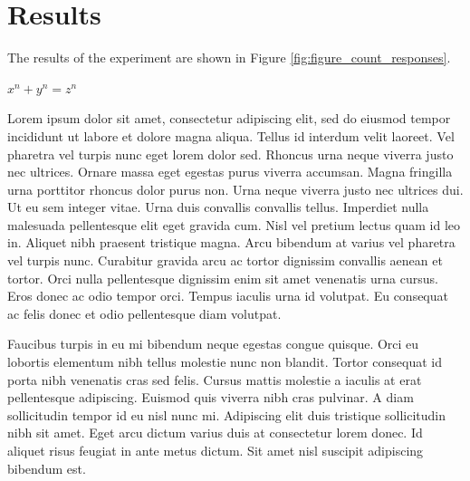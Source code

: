 

\section{Results}

The results of the experiment are shown in Figure \ref{fig:figure_count_responses}.

$ x^n + y^n = z^n $

Lorem ipsum dolor sit amet, consectetur adipiscing elit, sed do eiusmod tempor incididunt ut labore et dolore magna aliqua. Tellus id interdum velit laoreet. Vel pharetra vel turpis nunc eget lorem dolor sed. Rhoncus urna neque viverra justo nec ultrices. Ornare massa eget egestas purus viverra accumsan. Magna fringilla urna porttitor rhoncus dolor purus non. Urna neque viverra justo nec ultrices dui. Ut eu sem integer vitae. Urna duis convallis convallis tellus. Imperdiet nulla malesuada pellentesque elit eget gravida cum. Nisl vel pretium lectus quam id leo in. Aliquet nibh praesent tristique magna. Arcu bibendum at varius vel pharetra vel turpis nunc. Curabitur gravida arcu ac tortor dignissim convallis aenean et tortor. Orci nulla pellentesque dignissim enim sit amet venenatis urna cursus. Eros donec ac odio tempor orci. Tempus iaculis urna id volutpat. Eu consequat ac felis donec et odio pellentesque diam volutpat.

Faucibus turpis in eu mi bibendum neque egestas congue quisque. Orci eu lobortis elementum nibh tellus molestie nunc non blandit. Tortor consequat id porta nibh venenatis cras sed felis. Cursus mattis molestie a iaculis at erat pellentesque adipiscing. Euismod quis viverra nibh cras pulvinar. A diam sollicitudin tempor id eu nisl nunc mi. Adipiscing elit duis tristique sollicitudin nibh sit amet. Eget arcu dictum varius duis at consectetur lorem donec. Id aliquet risus feugiat in ante metus dictum. Sit amet nisl suscipit adipiscing bibendum est.

